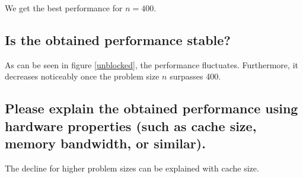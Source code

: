 \documentclass[11pt]{article}
\begin{document}
We get the best performance for $n = 400$.

\subsection*{Is the obtained performance stable?}

As can be seen in figure \ref{unblocked}, the performance fluctuates. Furthermore, it decreases noticeably once the problem size $n$ surpasses 400.

\subsection*{Please explain the obtained performance using hardware properties (such as cache size, memory bandwidth, or similar).}

The decline for higher problem sizes can be explained with cache size. %
\end{document}
